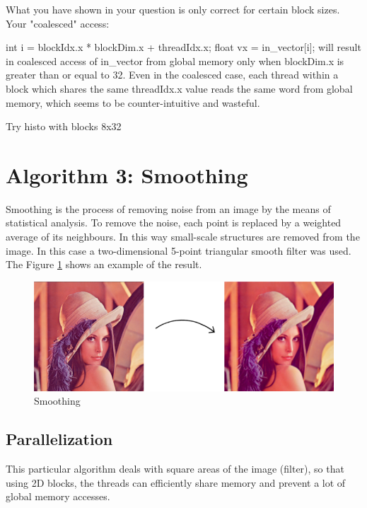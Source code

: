 \documentclass[a4paper]{article}
\begin{document}
 
 What you have shown in your question is only correct for certain block sizes. Your "coalesced" access:

int i = blockIdx.x * blockDim.x + threadIdx.x;
float vx = in\_vector[i];
will result in coalesced access of in\_vector from global memory only when blockDim.x is greater than or equal to 32. Even in the coalesced case, each thread within a block which shares the same threadIdx.x value reads the same word from global memory, which seems to be counter-intuitive and wasteful.

Try histo with blocks 8x32
\section{Algorithm 3: Smoothing}
\label{sec:smoo}
Smoothing is the process of removing noise from an image by the means of statistical analysis. To remove the noise, each point is replaced by a weighted average of its neighbours. In this way small-scale structures are removed from the image. In this case a two-dimensional 5-point triangular smooth filter was used. The Figure \ref{fig:smooth} shows an example of the result.

\begin{figure}[ht]
    \centering
    \includegraphics[width=0.5\linewidth]{smooth}
    \caption{Smoothing}
    \label{fig:smooth}
\end{figure}
\FloatBarrier


\subsection{Parallelization}
\label{sec:p2}
This particular algorithm deals with square areas of the image (filter), so that using 2D blocks, the threads can efficiently share memory and prevent a lot of global memory accesses.
\end{document}
